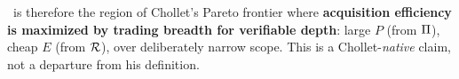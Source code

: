 \DCI\ is therefore the region of Chollet's Pareto frontier where \textbf{acquisition efficiency is maximized by trading breadth for verifiable depth}: large $P$ (from $\Pi$), cheap $E$ (from $\mathcal{R}$), over deliberately narrow scope. This is a Chollet-\emph{native} claim, not a departure from his definition.
